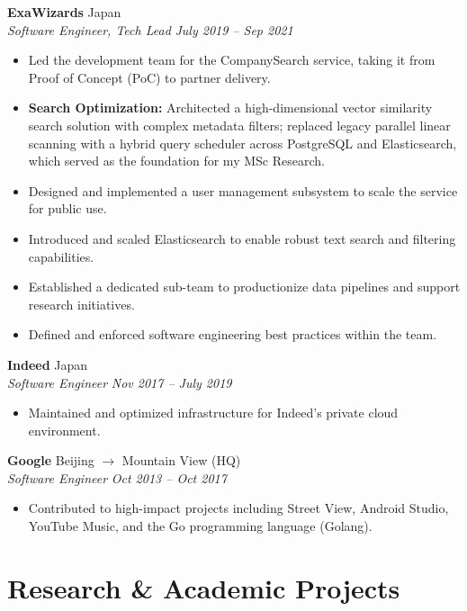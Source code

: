 \documentclass[10pt,a4paper]{article}
\newcommand{\entry}[4]{
  \textbf{#1} \hfill #2 \\
  \textit{#3} \hfill \textit{#4}
}
\begin{document}
\entry{ExaWizards}{Japan}{Software Engineer, Tech Lead}{July 2019 -- Sep 2021}
\begin{itemize}[noitemsep, leftmargin=*]
    \item Led the development team for the CompanySearch service, taking it from Proof of Concept (PoC) to partner delivery.
    \item \textbf{Search Optimization:} Architected a high-dimensional vector similarity search solution with complex metadata filters; replaced legacy parallel linear scanning with a hybrid query scheduler across PostgreSQL and Elasticsearch, which served as the foundation for my MSc Research.
    \item Designed and implemented a user management subsystem to scale the service for public use.
    \item Introduced and scaled Elasticsearch to enable robust text search and filtering capabilities.
    \item Established a dedicated sub-team to productionize data pipelines and support research initiatives.
    \item Defined and enforced software engineering best practices within the team.
\end{itemize}
\vspace{3pt}

\entry{Indeed}{Japan}{Software Engineer}{Nov 2017 -- July 2019}
\begin{itemize}[noitemsep, leftmargin=*]
    \item Maintained and optimized infrastructure for Indeed's private cloud environment.
\end{itemize}
\vspace{3pt}

\entry{Google}{Beijing $\to$ Mountain View (HQ)}{Software Engineer}{Oct 2013 -- Oct 2017}
\begin{itemize}[noitemsep, leftmargin=*]
    \item Contributed to high-impact projects including Street View, Android Studio, YouTube Music, and the Go programming language (Golang).
\end{itemize}

\newpage
\section{Research \& Academic Projects}
\end{document}
